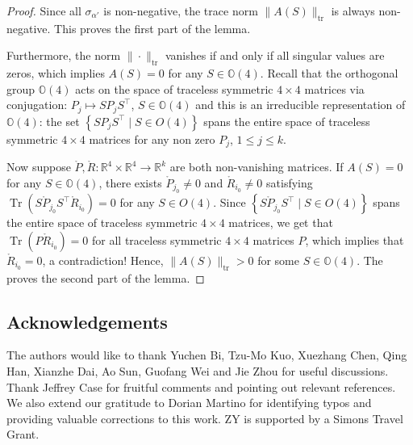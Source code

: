 \documentclass[11pt,letterpaper]{amsart}
\theoremstyle{definition}
\theoremstyle{remark}
\numberwithin{equation}{section}
\begin{document}
\begin{proof}
Since all $\sigma_{\alpha'}$ is non-negative, the trace norm $\|A(S)\|_{\mathrm{tr}}$ is always non-negative. This proves the first part of the lemma.

Furthermore, the norm $\|\cdot\|_{\mathrm{tr}}$ vanishes if and only if all singular values are zeros, which implies $A(S)=0$ for any $S \in \mathbb{O}(4)$. Recall that the orthogonal group $\mathbb{O}(4)$ acts on the space of traceless symmetric $4\times4$ matrices via conjugation:
$P_j \mapsto S P_j S^{\top}$, $S \in \mathbb{O}(4)$ and this is an irreducible representation of $\mathbb{O}(4)$: the set $\left\{S P_j S^{\top} \mid S \in O(4)\right\}$ spans the entire space of traceless symmetric
$4\times4$ matrices for any non zero $P_j$, $1\leq j\leq k$.

Now suppose $\mathring{P}, \mathring{R}: \mathbb{R}^4 \times \mathbb{R}^4 \to \mathbb{R}^k $ are both non-vanishing matrices. If $A(S)=0$ for any $S \in \mathbb{O}(4)$, there exists $\mathring{P}_{j_0} \neq 0$ and $\mathring{R}_{i_0} \neq 0$ satisfying $\operatorname{Tr}\left(S \mathring{P}_{j_0} S^{\top} \mathring{R}_{i_0}\right)=0$ for any $S \in O(4)$. Since $\left\{S \mathring{P}_{j_0} S^{\top} \mid S \in O(4)\right\}$ spans the entire space of traceless symmetric
$4\times4$ matrices, we get that 
$\operatorname{Tr}( P \mathring{R}_{i_0})=0$ for all traceless symmetric
$4\times4$ matrices $P$, which implies that $\mathring{R}_{i_0}=0$, a contradiction!
Hence, $\|A(S)\|_{\mathrm{tr}}>0$ for some $S \in \mathbb{O}(4)$. The proves the second part of the lemma.
 \end{proof}

\subsection*{Acknowledgements}

The authors would like to thank Yuchen Bi, Tzu-Mo Kuo, Xuezhang Chen, Qing Han, Xianzhe Dai, Ao Sun, Guofang Wei and Jie Zhou for useful discussions. Thank Jeffrey Case for fruitful comments and pointing out relevant references. We also extend our gratitude to Dorian Martino for identifying typos and providing valuable corrections to this work. ZY is supported by a Simons Travel Grant.






\end{document}
